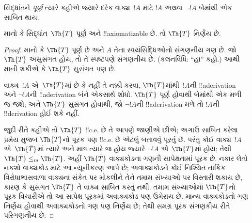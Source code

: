 \documentclass[../../../include/open-logic-section]{subfiles}
\begin{document}


સિદ્ધાંતને {\em પૂર્ણ} ત્યારે કહીએ
જ્યારે દરેક વાક્ય~$!A$ માટે
$!A$ અથવા $\lnot !A$
બેમાંથી એક સાબિત થાય.

\begin{lem}
માનો કે સિદ્ધાંત~$\Th{T}$
પૂર્ણ અને !!{axiomatizable} છે.
તો $\Th{T}$ નિર્ણેય છે.
\end{lem}

\begin{proof}
માનો કે $\Th{T}$ પૂર્ણ છે
અને $A$ તેના સ્વયંસિદ્ધિઓનો
સંગણનીય ગણ છે.
જો $\Th{T}$ અસુસંગત હોય,
તો તે સ્પષ્ટપણે સંગણનીય છે.
(કલનવિધિ: ``હા'' કહો.)
આથી માની શકીએ કે
$\Th{T}$ સુસંગત પણ છે.

વાક્ય~$!A$ એ~$\Th{T}$માં
છે કે નહીં તે નક્કી કરવા,
$\Th{T}$માંથી~$!A$ની
!!a{derivation} અને
$\lnot !A$ની !!a{derivation}
બંને એકસાથે શોધો.
$\Th{T}$ પૂર્ણ હોવાથી
બેમાંથી એક મળી જ જશે;
અને $\Th{T}$ સુસંગત હોવાથી,
જો $\lnot !A$ની
!!a{derivation} મળે તો
$!A$ની !!{derivation}
હોઈ શકે નહીં.

જુદી રીતે કહીએ તો
$\Th{T}$ !!{c.e.} છે
તે આપણે જાણીએ છીએ;
અગાઉ સાબિત કરેલા પ્રમેય
મુજબ $\Th{T}$નો પૂરક પણ
!!{c.e.} છે એટલું
બતાવવું પૂરતું છે.
પરંતુ કોઈ વાક્ય~$!A$ એ~$\Th{\bar
T}$માં ત્યારે અને માત્ર
ત્યારે જ હોય જ્યારે
$\lnot !A$ એ~$\Th{T}$માં
હોય; તેથી
$\Th{\bar T} \leq_m
\Th{T}$.
અહીં $\Th{\bar T}$ વાક્યકોડના ગણની સાપેક્ષતામાં
પૂરક છે. નકાર લેતો નકશો વાક્યકોડ માટે આ ન્યૂનીકરણ આપે છે;
અવાક્યકોડને કોઈ નિશ્ચિત તાર્કિક વિરોધાભાસવાળા વાક્યના સંકેત પર મોકલીને
તેને તમામ સંખ્યાઓ પર વિસ્તારી શકાય છે, કારણ કે
સુસંગત $\Th{T}$ તે વાક્ય સાબિત કરતું નથી.
તમામ સંખ્યાઓમાં $\Th{T}$નો પૂરક વિચારીએ તો
આ સાપેક્ષ પૂરકમાં અવાક્યકોડ પણ ઉમેરાય છે.
માન્ય વાક્યકોડનો ગણ નિર્ણેય હોવાથી અવાક્યકોડનો ગણ પણ
નિર્ણેય છે; તેથી સમગ્ર પૂરક સંગણકીય રીતે પરિગણનીય છે.
\end{proof}
\end{document}
